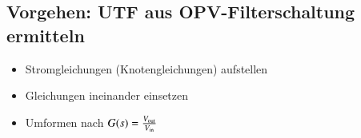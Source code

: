 \subsection{Vorgehen: UTF aus OPV-Filterschaltung ermitteln}
\begin{itemize}
    \item Stromgleichungen (Knotengleichungen) aufstellen
    \item Gleichungen ineinander einsetzen
    \item Umformen nach $G(s) = \frac{V_{\rm out}}{V_{\rm in}}$
\end{itemize}